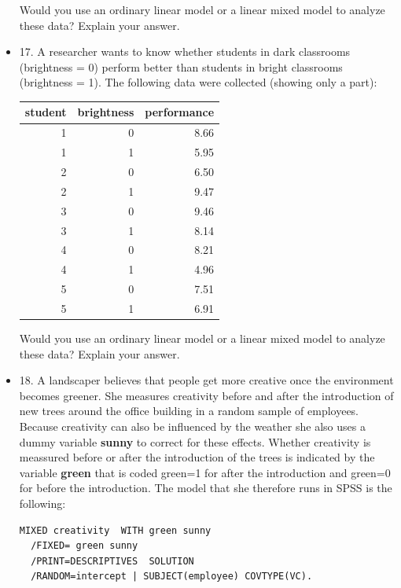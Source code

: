 \documentclass[]{report}\usepackage[]{graphicx}\usepackage[]{color}
\newenvironment{knitrout}{}{} %
\begin{document}
\begin{itemize}
\begin{knitrout}
\end{knitrout}

Would you use an ordinary linear model or a linear mixed model to analyze these data? Explain your answer.

\item 17. A researcher wants to know whether students in dark classrooms (brightness = 0) perform better than students in bright classrooms (brightness = 1). The following data were collected (showing only a part):


\begin{knitrout}
\color{fgcolor}
\begin{tabular}{r|r|r}
\hline
student & brightness & performance\\
\hline
1 & 0 & 8.66\\
\hline
1 & 1 & 5.95\\
\hline
2 & 0 & 6.50\\
\hline
2 & 1 & 9.47\\
\hline
3 & 0 & 9.46\\
\hline
3 & 1 & 8.14\\
\hline
4 & 0 & 8.21\\
\hline
4 & 1 & 4.96\\
\hline
5 & 0 & 7.51\\
\hline
5 & 1 & 6.91\\
\hline
\end{tabular}


\end{knitrout}

Would you use an ordinary linear model or a linear mixed model to analyze these data? Explain your answer.



\item 18.
A landscaper believes that people get more creative once the environment becomes greener. She measures creativity before and after the introduction of new trees around the office building in a random sample of employees. Because creativity can also be influenced by the weather she also uses a dummy variable \textbf{sunny} to correct for these effects. Whether creativity is meassured before or after the introduction of the trees is indicated by the variable \textbf{green} that is coded green=1 for after the introduction and green=0 for before the introduction. The model that she therefore runs in SPSS is the following:

\begin{verbatim}
MIXED creativity  WITH green sunny
  /FIXED= green sunny
  /PRINT=DESCRIPTIVES  SOLUTION
  /RANDOM=intercept | SUBJECT(employee) COVTYPE(VC).
\end{verbatim}


\end{itemize}
\end{document}
